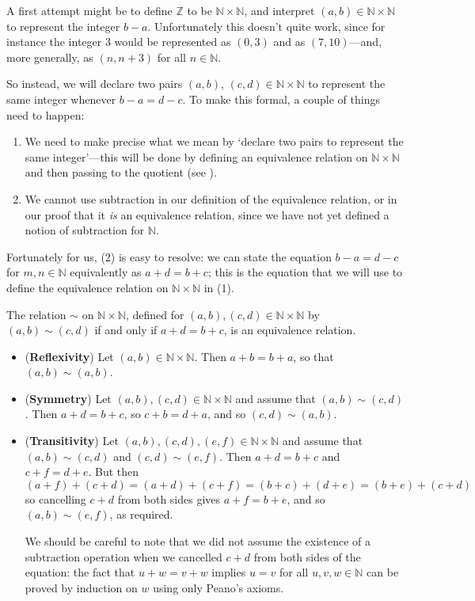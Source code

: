 A first attempt might be to define $\mathbb{Z}$ to be $\mathbb{N} \times \mathbb{N}$, and interpret $(a,b) \in \mathbb{N} \times \mathbb{N}$ to represent the integer $b-a$. Unfortunately this doesn't quite work, since for instance the integer $3$ would be represented as $(0,3)$ and as $(7,10)$---and, more generally, as $(n,n+3)$ for all $n \in \mathbb{N}$.

So instead, we will declare two pairs $(a,b)$, $(c,d) \in \mathbb{N} \times \mathbb{N}$ to represent the same integer whenever $b-a = d-c$. To make this formal, a couple of things need to happen:
\begin{enumerate}[(1)]
\item We need to make precise what we mean by `declare two pairs to represent the same integer'---this will be done by defining an equivalence relation on $\mathbb{N} \times \mathbb{N}$ and then passing to the quotient (see ).
\item We cannot use subtraction in our definition of the equivalence relation, or in our proof that it \textit{is} an equivalence relation, since we have not yet defined a notion of subtraction for $\mathbb{N}$.
\end{enumerate}

Fortunately for us, (2) is easy to resolve: we can state the equation $b-a = d-c$ for $m,n \in \mathbb{N}$ equivalently as $a+d = b+c$; this is the equation that we will use to define the equivalence relation on $\mathbb{N} \times \mathbb{N}$ in (1).

\begin{lemma}
The relation $\sim$ on $\mathbb{N} \times \mathbb{N}$, defined for $(a,b), (c,d) \in \mathbb{N} \times \mathbb{N}$ by $(a,b) \sim (c,d)$ if and only if $a+d=b+c$, is an equivalence relation.
\end{lemma}

\begin{cproof}
\fixlistskip%
\begin{itemize}
\item (\textbf{Reflexivity}) Let $(a,b) \in \mathbb{N} \times \mathbb{N}$. Then $a+b = b+a$, so that $(a,b) \sim (a,b)$.
\item (\textbf{Symmetry}) Let $(a,b), (c,d) \in \mathbb{N} \times \mathbb{N}$ and assume that $(a,b) \sim (c,d)$. Then $a+d=b+c$, so $c+b=d+a$, and so $(c,d) \sim (a,b)$.
\item (\textbf{Transitivity}) Let $(a,b), (c,d), (e,f) \in \mathbb{N} \times \mathbb{N}$ and assume that $(a,b) \sim (c,d)$ and $(c,d) \sim (e,f)$. Then $a+d=b+c$ and $c+f=d+e$. But then
\[ (a + f) + (c + d) = (a+d) + (c+f) = (b+c) + (d+e) = (b+e) + (c+d) \]
so cancelling $c+d$ from both sides gives $a+f = b+e$, and so $(a,b) \sim (e,f)$, as required.

We should be careful to note that we did not assume the existence of a subtraction operation when we cancelled $c+d$ from both sides of the equation: the fact that $u+w=v+w$ implies $u=v$ for all $u,v,w \in \mathbb{N}$ can be proved by induction on $w$ using only Peano's axioms.
\fixlistskip%
\end{itemize}
\end{cproof}

